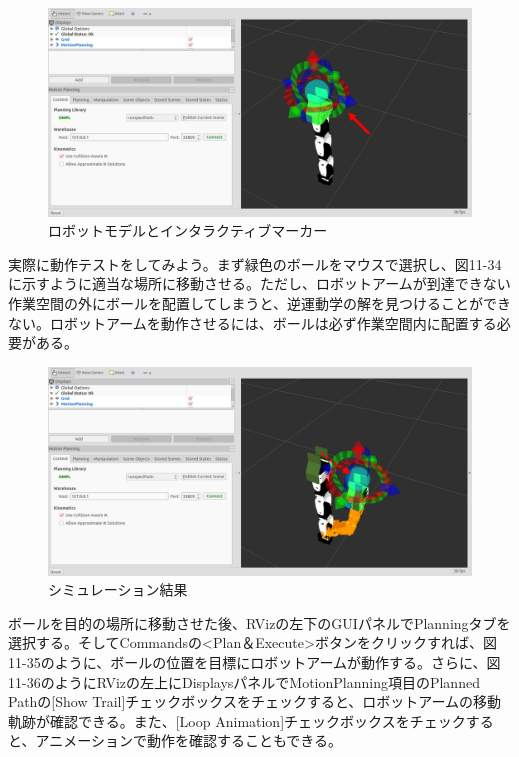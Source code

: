 \begin{figure}[htp]
  \centering
  \includegraphics[width=12cm]{pictures/chapter11/pic_11_33.png}
  \caption{ロボットモデルとインタラクティブマーカー}
\end{figure}

実際に動作テストをしてみよう。まず緑色のボールをマウスで選択し、図11-34に示すように適当な場所に移動させる。ただし、ロボットアームが到達できない作業空間の外にボールを配置してしまうと、逆運動学の解を見つけることができない。ロボットアームを動作させるには、ボールは必ず作業空間内に配置する必要がある。

\begin{figure}[htp]
  \centering
  \includegraphics[width=12cm]{pictures/chapter11/pic_11_34.png}
  \caption{シミュレーション結果}
\end{figure}

ボールを目的の場所に移動させた後、RVizの左下のGUIパネルでPlanningタブを選択する。そしてCommandsの<Plan＆Execute>ボタンをクリックすれば、図11-35のように、ボールの位置を目標にロボットアームが動作する。さらに、図11-36のようにRVizの左上にDisplaysパネルでMotionPlanning項目のPlanned Pathの[Show Trail]チェックボックスをチェックすると、ロボットアームの移動軌跡が確認できる。また、[Loop Animation]チェックボックスをチェックすると、アニメーションで動作を確認することもできる。


